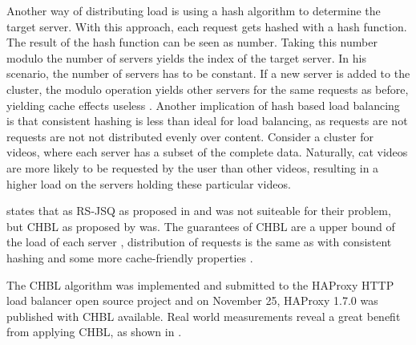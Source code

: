 Another way of distributing load is using a hash algorithm to determine the
target server.
With this approach, each request gets hashed with a hash function.
The result of the hash function can be seen as number.
Taking this number modulo the number of servers yields the index of the target
server.
In his scenario, the number of servers has to be constant.
If a new server is added to the cluster, the modulo operation yields other
servers for the same requests as before, yielding cache effects useless
\cite{medVimeoEngin}.
Another implication of hash based load balancing is that consistent hashing is
less than ideal for load balancing, as requests are not requests are not not
distributed evenly over content.
Consider a cluster for videos, where each server has a subset of the complete
data.
Naturally, cat videos are more likely to be requested by the user than other
videos, resulting in a higher load on the servers holding these particular
videos.

\cite{medVimeoEngin} states that as RS-JSQ as proposed in \cite{powerOfTwoInRLB}
and \cite{powerOfTwoRandomChoices} was not suiteable for their problem, but
\ac{CHBL} as proposed by
\cite{ConsistentHashingWithBoundedLoads} was.
The guarantees of \ac{CHBL} are a upper bound of the load of each server
\cite{ConsistentHashingWithBoundedLoads},
distribution of requests is the same as with consistent hashing and some more
cache-friendly properties \cite{medVimeoEngin}.

The \ac{CHBL} algorithm was implemented and submitted to the HAProxy HTTP load
balancer open source project and on November 25, HAProxy 1.7.0 was published
with \ac{CHBL} available.
Real world measurements reveal a great benefit from applying \ac{CHBL}, as shown
in \cite{medVimeoEngin}.

